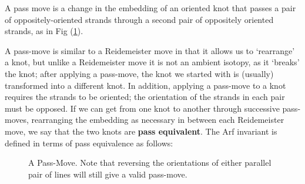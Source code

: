 \documentclass{article}
\begin{document}
\begin{definition} A pass move is a change in the embedding of an oriented knot that passes a pair of oppositely-oriented strands through a second pair of oppositely oriented strands, as in Fig (\ref{fig:pass move}).
\end{definition}
A pass-move is similar to a Reidemeister move in that it allows us to `rearrange' a knot, but unlike a Reidemeister move it is not an ambient isotopy, as it `breaks' the knot; after applying a pass-move, the knot we started with is (usually) transformed into a different knot. In addition, applying a pass-move to a knot requires the strands to be oriented; the orientation of the strands in each pair must be opposed. If we can get from one knot to another through successive pass-moves, rearranging the embedding as necessary in between each Reidemeister move, we say that the two knots are \textbf{pass equivalent}. The Arf invariant is defined in terms of pass equivalence as follows:\\


\begin{figure}
\centering
{}
\caption{A Pass-Move. Note that reversing the orientations of either parallel pair of lines will still give a valid pass-move.}
\label{fig:pass move}
\end{figure}
\end{document}
